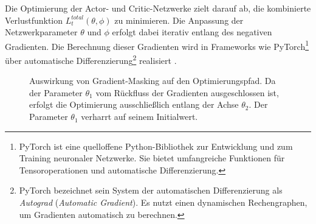 Die Optimierung der Actor\hyp{} und Critic\hyp{}Netzwerke zielt darauf ab, die kombinierte Verlustfunktion $L_t^{total}(\theta, \phi)$ zu minimieren.
Die Anpassung der Netzwerkparameter $\theta$ und $\phi$ erfolgt dabei iterativ entlang des negativen Gradienten. Die Berechnung dieser Gradienten wird in Frameworks wie PyTorch\footnote{PyTorch ist eine quelloffene Python\hyp{}Bibliothek zur Entwicklung und zum Training neuronaler Netzwerke. Sie bietet umfangreiche Funktionen für Tensoroperationen und automatische Differenzierung.}
über automatische Differenzierung\footnote{PyTorch bezeichnet sein System der automatischen Differenzierung als \textit{Autograd} (\textit{Automatic Gradient}). Es nutzt einen dynamischen Rechengraphen, um Gradienten automatisch zu berechnen.} realisiert \cite[Kap. 2]{PyTorch_Fundamentals}.

\begin{figure}[htbp]
    \centering
    \caption[Gradient\hyp{}Masking Auswirkung]{Auswirkung von Gradient\hyp{}Masking auf den Optimierungspfad. Da der Parameter $\theta_1$ vom Rückfluss der Gradienten ausgeschlossen ist, erfolgt die Optimierung ausschließlich entlang der Achse $\theta_2$. Der Parameter $\theta_1$ verharrt auf seinem Initialwert.}
    \label{fig:gradient_descent_gated}
\end{figure}
\medskip


